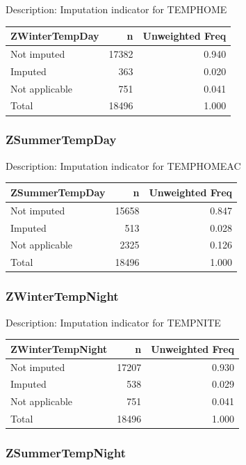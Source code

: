 \documentclass[
]{krantz}
\begin{document}
Description: Imputation indicator for TEMPHOME

\begin{tabular}[t]{l|r|r}
\hline
ZWinterTempDay & n & Unweighted Freq\\
\hline
Not imputed & 17382 & 0.940\\
\hline
Imputed & 363 & 0.020\\
\hline
Not applicable & 751 & 0.041\\
\hline
Total & 18496 & 1.000\\
\hline
\end{tabular}

\hypertarget{zsummertempday}{%
\subsubsection*{ZSummerTempDay}\label{zsummertempday}}


Description: Imputation indicator for TEMPHOMEAC

\begin{tabular}[t]{l|r|r}
\hline
ZSummerTempDay & n & Unweighted Freq\\
\hline
Not imputed & 15658 & 0.847\\
\hline
Imputed & 513 & 0.028\\
\hline
Not applicable & 2325 & 0.126\\
\hline
Total & 18496 & 1.000\\
\hline
\end{tabular}

\hypertarget{zwintertempnight}{%
\subsubsection*{ZWinterTempNight}\label{zwintertempnight}}


Description: Imputation indicator for TEMPNITE

\begin{tabular}[t]{l|r|r}
\hline
ZWinterTempNight & n & Unweighted Freq\\
\hline
Not imputed & 17207 & 0.930\\
\hline
Imputed & 538 & 0.029\\
\hline
Not applicable & 751 & 0.041\\
\hline
Total & 18496 & 1.000\\
\hline
\end{tabular}

\hypertarget{zsummertempnight}{%
\subsubsection*{ZSummerTempNight}\label{zsummertempnight}}
\end{document}
